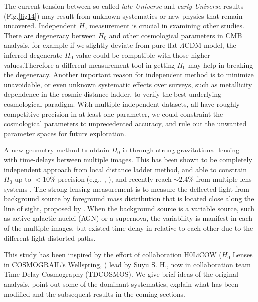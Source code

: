 \documentclass{cosmo}
\begin{document}
    
    The current tension between so-called \emph{late Universe} and \emph{early Universe} results (Fig.\ref{fig14}) may result from unknown systematics or new physics that remain uncovered. Independent $H_\mathrm{0}$ measurement is crucial in examining other studies.
    There are degeneracy between $H_\mathrm{0}$ and other cosmological parameters in CMB analysis, for example if we slightly deviate from pure flat $\Lambda$CDM model, the inferred degenerate $H_\mathrm{0}$ value could be compatible with those higher values.Therefore a different measurement tool in getting $H_\mathrm{0}$ may help in breaking the degeneracy. 
    Another important reason for independent method is to minimize unavoidable, or even unknown systematic effects over surveys, such as metallicity dependence in the cosmic distance ladder, to verify the best underlying cosmological paradigm. With multiple independent datasets, all have roughly competitive precision in at least one parameter, we could constraint the cosmological parameters to unprecedented accuracy, and rule out the unwanted parameter spaces for future exploration.
    
    A new geometry method to obtain $H_\mathrm{0}$ is through strong gravitational lensing with time-delays between multiple images. This has been shown to be completely independent approach from local distance ladder method, and able to constrain $H_\mathrm{0}$ up to $< 10 \%$ precision (e.g., \citealt{Suyu2010}, \citealt{Suyu2014}), and recently reach $\sim 2.4 \%$ from multiple lens systems \citep{Wong2019}. The strong lensing measurement is to measure the deflected light from background source by foreground mass distribution that is located close along the line of sight, proposed by \cite{Refsdal1964}. When the background source is a variable source, such as active galactic nuclei (AGN) or a supernova, the variability is manifest in each of the multiple images, but existed time-delay in relative to each other due to the different light distorted paths. 
    
    This study has been inspired by the effort of collaboration H0LiCOW ($H_\mathrm{0}$ Lenses in COSMOGRAIL’s Wellspring, \citealt{Suyu2017}) lead by Suyu S. H., now in collaboration team Time-Delay Cosmography (TDCOSMOS). We give brief ideas of the original analysis, point out some of the dominant systematics, explain what has been modified and the subsequent results in the coming sections.
    
\end{document}
